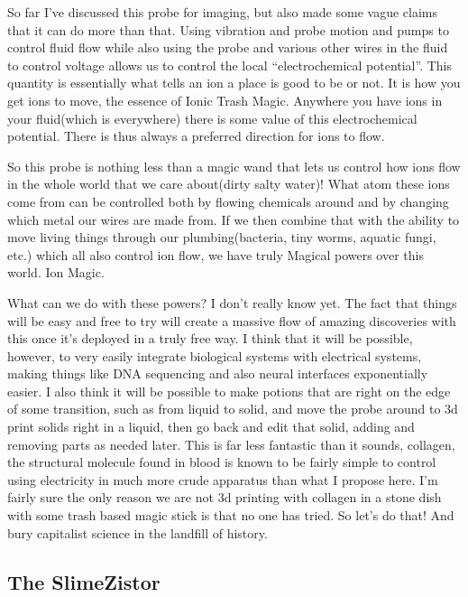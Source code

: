 So far I've discussed this probe for imaging, but also made some vague
claims that it can do more than that. Using vibration and probe motion
and pumps to control fluid flow while also using the probe and various
other wires in the fluid to control voltage allows us to control the
local ``electrochemical potential''. This quantity is essentially what
tells an ion a place is good to be or not. It is how you get ions to
move, the essence of Ionic Trash Magic. Anywhere you have ions in your
fluid(which is everywhere) there is some value of this electrochemical
potential. There is thus always a preferred direction for ions to flow.

So this probe is nothing less than a magic wand that lets us control how
ions flow in the whole world that we care about(dirty salty water)! What
atom these ions come from can be controlled both by flowing chemicals
around and by changing which metal our wires are made from. If we then
combine that with the ability to move living things through our
plumbing(bacteria, tiny worms, aquatic fungi, etc.) which all also
control ion flow, we have truly Magical powers over this world. Ion
Magic.

What can we do with these powers? I don't really know yet. The fact that
things will be easy and free to try will create a massive flow of
amazing discoveries with this once it's deployed in a truly free way. I
think that it will be possible, however, to very easily integrate
biological systems with electrical systems, making things like DNA
sequencing and also neural interfaces exponentially easier. I also think
it will be possible to make potions that are right on the edge of some
transition, such as from liquid to solid, and move the probe around to
3d print solids right in a liquid, then go back and edit that solid,
adding and removing parts as needed later. This is far less fantastic
than it sounds, collagen, the structural molecule found in blood is
known to be fairly simple to control using electricity in much more
crude apparatus than what I propose here. I'm fairly sure the only
reason we are not 3d printing with collagen in a stone dish with some
trash based magic stick is that no one has tried. So let's do that! And
bury capitalist science in the landfill of history.

\subsection{The SlimeZistor}\label{the-slimezistor}

